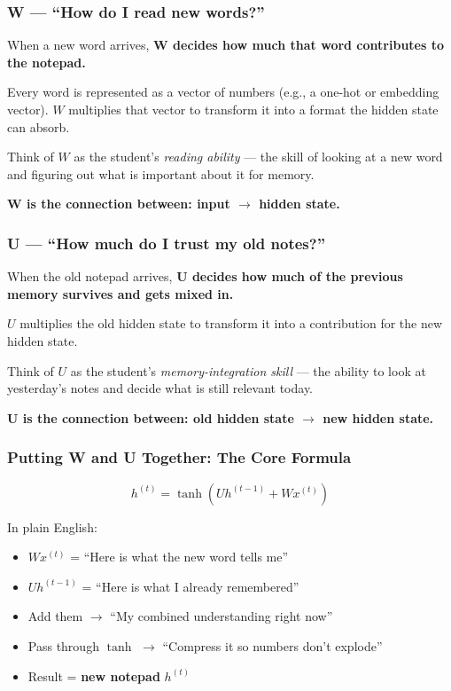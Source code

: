 \documentclass[12pt,a4paper]{article}
\begin{document}
\subsubsection{W — ``How do I read new words?''}

When a new word arrives, \textbf{W decides how much that word contributes to the notepad.}

Every word is represented as a vector of numbers (e.g., a one-hot or embedding vector). $W$ multiplies that vector to transform it into a format the hidden state can absorb.

Think of $W$ as the student's \textit{reading ability} --- the skill of looking at a new word and figuring out what is important about it for memory.

\textbf{W is the connection between: input $\rightarrow$ hidden state.}

\subsubsection{U — ``How much do I trust my old notes?''}

When the old notepad arrives, \textbf{U decides how much of the previous memory survives and gets mixed in.}

$U$ multiplies the old hidden state to transform it into a contribution for the new hidden state.

Think of $U$ as the student's \textit{memory-integration skill} --- the ability to look at yesterday's notes and decide what is still relevant today.

\textbf{U is the connection between: old hidden state $\rightarrow$ new hidden state.}

\subsubsection{Putting W and U Together: The Core Formula}

\[
h^{(t)} = \tanh\!\left(U h^{(t-1)} + W x^{(t)}\right)
\]

In plain English:
\begin{itemize}
    \item $W x^{(t)}$ = ``Here is what the new word tells me''
    \item $U h^{(t-1)}$ = ``Here is what I already remembered''
    \item Add them $\rightarrow$ ``My combined understanding right now''
    \item Pass through $\tanh$ $\rightarrow$ ``Compress it so numbers don't explode''
    \item Result = \textbf{new notepad} $h^{(t)}$
\end{itemize}
\end{document}
